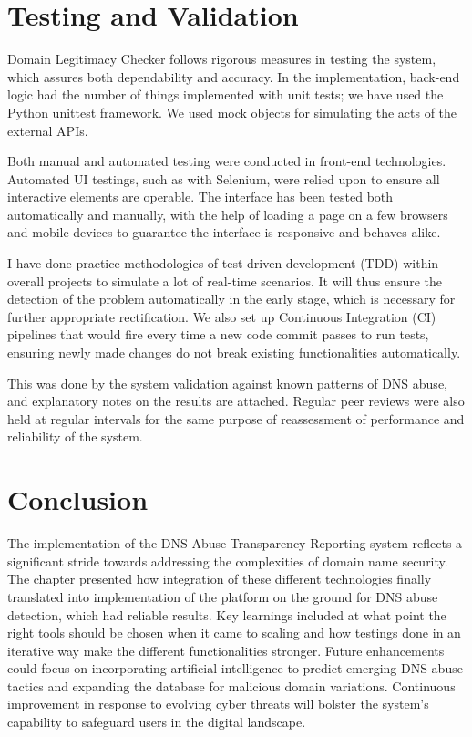 \section{Testing and Validation}

Domain Legitimacy Checker follows rigorous measures in testing the system, which assures both dependability and accuracy. In the implementation, back-end logic had the number of things implemented with unit tests; we have used the Python unittest framework. We used mock objects for simulating the acts of the external APIs.

Both manual and automated testing were conducted in front-end technologies. Automated UI testings, such as with Selenium, were relied upon to ensure all interactive elements are operable. The interface has been tested both automatically and manually, with the help of loading a page on a few browsers and mobile devices to guarantee the interface is responsive and behaves alike.

I have done practice methodologies of test-driven development (TDD) within overall projects to simulate a lot of real-time scenarios. It will thus ensure the detection of the problem automatically in the early stage, which is necessary for further appropriate rectification. We also set up Continuous Integration (CI) pipelines that would fire every time a new code commit passes to run tests, ensuring newly made changes do not break existing functionalities automatically.

This was done by the system validation against known patterns of DNS abuse, and explanatory notes on the results are attached. Regular peer reviews were also held at regular intervals for the same purpose of reassessment of performance and reliability of the system.


\section{Conclusion}

The implementation of the DNS Abuse Transparency Reporting system reflects a significant stride towards addressing the complexities of domain name security. The chapter presented how integration of these different technologies finally translated into implementation of the platform on the ground for DNS abuse detection, which had reliable results. Key learnings included at what point the right tools should be chosen when it came to scaling and how testings done in an iterative way make the different functionalities stronger. Future enhancements could focus on incorporating artificial intelligence to predict emerging DNS abuse tactics and expanding the database for malicious domain variations. Continuous improvement in response to evolving cyber threats will bolster the system's capability to safeguard users in the digital landscape.
